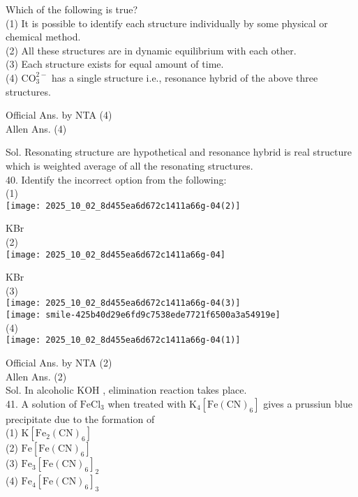 \documentclass[10pt]{article}
\begin{document}
Which of the following is true?\\
(1) It is possible to identify each structure individually by some physical or chemical method.\\
(2) All these structures are in dynamic equilibrium with each other.\\
(3) Each structure exists for equal amount of time.\\
(4) \(\mathrm{CO}_{3}^{2-}\) has a single structure i.e., resonance hybrid of the above three structures.

Official Ans. by NTA (4)\\
Allen Ans. (4)

Sol. Resonating structure are hypothetical and resonance hybrid is real structure which is weighted average of all the resonating structures.\\
40. Identify the incorrect option from the following:\\
(1)\\
\texttt{[image: 2025\_10\_02\_8d455ea6d672c1411a66g-04(2)]}

KBr\\
(2)\\
\texttt{[image: 2025\_10\_02\_8d455ea6d672c1411a66g-04]}

KBr\\
(3)\\
\texttt{[image: 2025\_10\_02\_8d455ea6d672c1411a66g-04(3)]}\\
\texttt{[image: smile-425b40d29e6fd9c7538ede7721f6500a3a54919e]}\\
(4)\\
\texttt{[image: 2025\_10\_02\_8d455ea6d672c1411a66g-04(1)]}

Official Ans. by NTA (2)\\
Allen Ans. (2)\\
Sol. In alcoholic KOH , elimination reaction takes place.\\
41. A solution of \(\mathrm{FeCl}_{3}\) when treated with \(\mathrm{K}_{4}\left[\mathrm{Fe}(\mathrm{CN})_{6}\right]\) gives a prussiun blue precipitate due to the formation of\\
(1) \(\mathrm{K}\left[\mathrm{Fe}_{2}(\mathrm{CN})_{6}\right]\)\\
(2) \(\mathrm{Fe}\left[\mathrm{Fe}(\mathrm{CN})_{6}\right]\)\\
(3) \(\mathrm{Fe}_{3}\left[\mathrm{Fe}(\mathrm{CN})_{6}\right]_{2}\)\\
(4) \(\mathrm{Fe}_{4}\left[\mathrm{Fe}(\mathrm{CN})_{6}\right]_{3}\)
\end{document}
